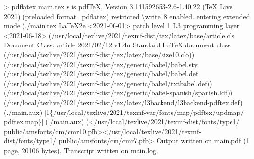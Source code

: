 \documentclass[
  a4paper,
]{scrreport}
\newenvironment{Shaded}{\begin{snugshade}}{\end{snugshade}}
\newcommand{\BuiltInTok}[1]{\textcolor[rgb]{0.00,0.23,0.31}{#1}}
\newcommand{\DataTypeTok}[1]{\textcolor[rgb]{0.68,0.00,0.00}{#1}}
\newcommand{\ErrorTok}[1]{\textcolor[rgb]{0.68,0.00,0.00}{#1}}
\newcommand{\ExtensionTok}[1]{\textcolor[rgb]{0.00,0.23,0.31}{#1}}
\newcommand{\KeywordTok}[1]{\textcolor[rgb]{0.00,0.23,0.31}{#1}}
\newcommand{\NormalTok}[1]{\textcolor[rgb]{0.00,0.23,0.31}{#1}}
\newcommand{\OperatorTok}[1]{\textcolor[rgb]{0.37,0.37,0.37}{#1}}
\newcommand{\VariableTok}[1]{\textcolor[rgb]{0.07,0.07,0.07}{#1}}
\begin{document}
\begin{Shaded}
\begin{Highlighting}[]
\OperatorTok{\textgreater{}}\NormalTok{ pdflatex }\ExtensionTok{main.tex} 
\ExtensionTok{s}\NormalTok{ is pdfTeX, Version 3.141592653{-}2.6{-}1.40.22 }\ErrorTok{(}\ExtensionTok{TeX}\NormalTok{ Live 2021}\KeywordTok{)} \KeywordTok{(}\ExtensionTok{preloaded} 
\VariableTok{format}\OperatorTok{=}\NormalTok{pdflatex}\KeywordTok{)} \ExtensionTok{restricted} \DataTypeTok{\textbackslash{}w}\NormalTok{rite18 enabled.}
\ExtensionTok{entering}\NormalTok{ extended mode}
\KeywordTok{(}\ExtensionTok{./main.tex}
\ExtensionTok{LaTeX2e} \OperatorTok{\textless{}}\NormalTok{2021{-}06{-}01}\OperatorTok{\textgreater{}}\NormalTok{ patch level 1}
\ExtensionTok{L3}\NormalTok{ programming layer }\OperatorTok{\textless{}}\NormalTok{2021{-}06{-}18}\OperatorTok{\textgreater{}}
\KeywordTok{(}\ExtensionTok{/usr/local/texlive/2021/texmf{-}dist/tex/latex/base/article.cls}
\ExtensionTok{Document}\NormalTok{ Class: article 2021/02/12 v1.4n Standard LaTeX document class}
\KeywordTok{(}\ExtensionTok{/usr/local/texlive/2021/texmf{-}dist/tex/latex/base/size10.clo}\KeywordTok{))}
\KeywordTok{(}\ExtensionTok{/usr/local/texlive/2021/texmf{-}dist/tex/generic/babel/babel.sty}
\KeywordTok{(}\ExtensionTok{/usr/local/texlive/2021/texmf{-}dist/tex/generic/babel/babel.def}
\KeywordTok{(}\ExtensionTok{/usr/local/texlive/2021/texmf{-}dist/tex/generic/babel/txtbabel.def}\KeywordTok{))}
\KeywordTok{(}\ExtensionTok{/usr/local/texlive/2021/texmf{-}dist/tex/generic/babel{-}spanish/spanish.ldf}\KeywordTok{))}
\KeywordTok{(}\ExtensionTok{/usr/local/texlive/2021/texmf{-}dist/tex/latex/l3backend/l3backend{-}pdftex.def}\KeywordTok{)}
\KeywordTok{(}\ExtensionTok{./main.aux}\KeywordTok{)} \ExtensionTok{[1\{/usr/local/texlive/2021/texmf{-}var/fonts/map/pdftex/updmap/}
\ExtensionTok{pdftex.map\}]} \ErrorTok{(}\ExtensionTok{./main.aux}\KeywordTok{)} \KeywordTok{)}\OperatorTok{\textless{}}\NormalTok{/usr/local/texlive/2021/texmf{-}dist/fonts/type1/}
\ExtensionTok{public/amsfonts/cm/cmr10.pfb}\OperatorTok{\textgreater{}\textless{}}\NormalTok{/usr/local/texlive/2021/texmf{-}dist/fonts/type1/}
\ExtensionTok{public/amsfonts/cm/cmr7.pfb}\OperatorTok{\textgreater{}}
\ExtensionTok{Output}\NormalTok{ written on main.pdf }\ErrorTok{(}\ExtensionTok{1}\NormalTok{ page, 20106 bytes}\KeywordTok{)}\BuiltInTok{.}
\ExtensionTok{Transcript}\NormalTok{ written on main.log.}
\end{Highlighting}
\end{Shaded}
\end{document}
